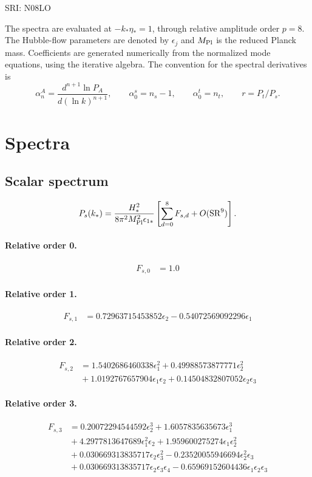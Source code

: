 \documentclass[10pt]{article}
\begin{document}
\begin{center}\Large SRI: N08LO\end{center}
The spectra are evaluated at $-k_*\eta_*=1$, through relative amplitude
order $p=8$. The Hubble-flow parameters are denoted by $\epsilon_j$
and $M_{\rm Pl}$ is the reduced Planck mass. Coefficients are generated
numerically from the normalized mode equations, using the iterative algebra.
The convention for the spectral derivatives is
\[
\alpha_n^A=\frac{d^{n+1}\ln P_A}{d(\ln k)^{n+1}},\qquad
\alpha_0^s=n_s-1,\qquad\alpha_0^t=n_t,\qquad r=P_t/P_s.
\]
\section{Spectra}

\subsection{Scalar spectrum}
\[P_s(k_*)=\frac{H_*^2}{8\pi^2M_{\rm Pl}^2\epsilon_{1*}}\left[\sum_{d=0}^{8}F_{s,d}+O(\mathrm{SR}^{9})\right].\]
\paragraph{Relative order 0.}
\begin{align*}
F_{s,0} &= 1.0
\end{align*}

\paragraph{Relative order 1.}
\begin{align*}
F_{s,1} &= 0.72963715453852 \epsilon_{2} - 0.54072569092296 \epsilon_{1}
\end{align*}

\paragraph{Relative order 2.}
\begin{align*}
F_{s,2} &= 1.5402686460338 \epsilon_{1}^{2} + 0.49988573877771 \epsilon_{2}^{2} \\
&{}  + 1.0192767657904 \epsilon_{1} \epsilon_{2} + 0.14504832807052 \epsilon_{2} \epsilon_{3}
\end{align*}

\paragraph{Relative order 3.}
\begin{align*}
F_{s,3} &= 0.20072294544592 \epsilon_{2}^{3} + 1.6057835635673 \epsilon_{1}^{3} \\
&{}  + 4.2977813647689 \epsilon_{1}^{2} \epsilon_{2} + 1.959600275274 \epsilon_{1} \epsilon_{2}^{2} \\
&{}  + 0.030669313835717 \epsilon_{2} \epsilon_{3}^{2} - 0.23520055946694 \epsilon_{2}^{2} \epsilon_{3} \\
&{}  + 0.030669313835717 \epsilon_{2} \epsilon_{3} \epsilon_{4} - 0.65969152604436 \epsilon_{1} \epsilon_{2} \epsilon_{3}
\end{align*}
\end{document}
